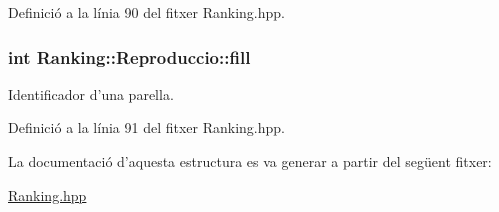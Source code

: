 Definició a la línia 90 del fitxer Ranking.\-hpp.

\hypertarget{struct_ranking_1_1_reproduccio_ada535ed71719e8eefc693b2f1e1b495e}{
\subsubsection[{fill}]{\setlength{\rightskip}{0pt plus 5cm}int Ranking\-::\-Reproduccio\-::fill}}\label{struct_ranking_1_1_reproduccio_ada535ed71719e8eefc693b2f1e1b495e}


Identificador d'una parella. 



Definició a la línia 91 del fitxer Ranking.\-hpp.



La documentació d'aquesta estructura es va generar a partir del següent fitxer\-:\begin{DoxyCompactItemize}
\item 
\hyperlink{_ranking_8hpp}{Ranking.\-hpp}\end{DoxyCompactItemize}
